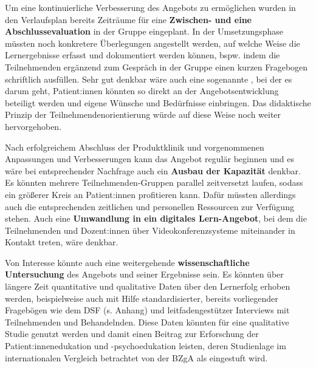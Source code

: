 \documentclass[
  twoside,
  parskip=half-,
  paper=176mm:246mm,
  BCOR=14mm,
  DIV=14,
]{scrreprt}
\begin{document}
Um eine kontinuierliche Verbesserung des Angebots zu ermöglichen wurden in den Verlaufsplan bereits Zeiträume für eine \textbf{Zwischen- und eine Abschlussevaluation} in der Gruppe eingeplant. In der Umsetzungsphase müssten noch konkretere Überlegungen angestellt werden, auf welche Weise die Lernergebnisse erfasst und dokumentiert werden können, bspw. indem die Teilnehmenden ergänzend zum Gespräch in der Gruppe einen kurzen Fragebogen schriftlich ausfüllen. Sehr gut denkbar wäre auch eine sogenannte \textbf{}, bei der es darum geht,  Patient:innen könnten so direkt an der Angebotsentwicklung beteiligt werden und eigene Wünsche und Bedürfnisse einbringen. Das didaktische Prinzip der Teilnehmendenorientierung würde auf diese Weise noch weiter hervorgehoben.

Nach erfolgreichem Abschluss der Produktklinik und vorgenommenen Anpassungen und Verbesserungen kann das Angebot regulär beginnen und es wäre bei entsprechender Nachfrage auch ein \textbf{Ausbau der Kapazität} denkbar. Es könnten mehrere Teilnehmenden-Gruppen parallel zeitversetzt laufen, sodass ein größerer Kreis an Patient:innen profitieren kann. Dafür müssten allerdings auch die entsprechenden zeitlichen und personellen Ressourcen zur Verfügung stehen. Auch eine \textbf{Umwandlung in ein digitales Lern-Angebot}, bei dem die Teilnehmenden und Dozent:innen über Videokonferenzsysteme miteinander in Kontakt treten, wäre denkbar.

Von Interesse könnte auch eine weitergehende \textbf{wissenschaftliche Untersuchung} des Angebots und seiner Ergebnisse sein. Es könnten über längere Zeit quantitative und qualitative Daten über den Lernerfolg erhoben werden, beispielweise auch mit Hilfe standardisierter, bereits vorliegender Fragebögen wie dem DSF (s. Anhang) und leitfadengestützer Interviews mit Teilnehmenden und Behandelnden. Diese Daten könnten für eine qualitative Studie genutzt werden und damit einen Beitrag zur Erforschung der Patient:innenedukation und -psychoedukation leisten, deren Studienlage im internationalen Vergleich betrachtet von der BZgA als  eingestuft wird.
\end{document}
